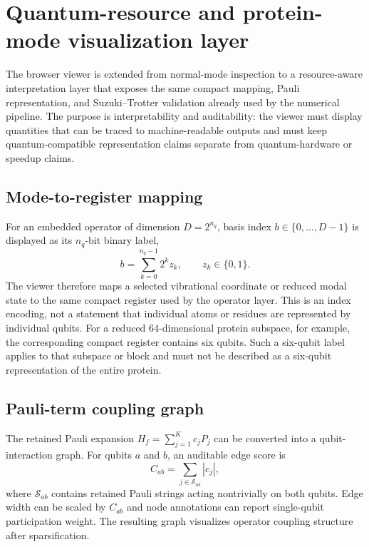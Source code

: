 \documentclass[aps,prx,reprint,10pt]{revtex4-2}
\begin{document}
\pagestyle{empty}
\appendix
\section{Quantum-resource and protein-mode visualization layer}

The browser viewer is extended from normal-mode inspection to a resource-aware interpretation layer that exposes the same compact mapping, Pauli representation, and Suzuki--Trotter validation already used by the numerical pipeline. The purpose is interpretability and auditability: the viewer must display quantities that can be traced to machine-readable outputs and must keep quantum-compatible representation claims separate from quantum-hardware or speedup claims.

\subsection{Mode-to-register mapping}
For an embedded operator of dimension $D=2^{n_q}$, basis index $b\in\{0,\ldots,D-1\}$ is displayed as its $n_q$-bit binary label,
\begin{equation}
 b = \sum_{k=0}^{n_q-1} 2^k z_k,\qquad z_k\in\{0,1\}.
\end{equation}
The viewer therefore maps a selected vibrational coordinate or reduced modal state to the same compact register used by the operator layer. This is an index encoding, not a statement that individual atoms or residues are represented by individual qubits. For a reduced $64$-dimensional protein subspace, for example, the corresponding compact register contains six qubits. Such a six-qubit label applies to that subspace or block and must not be described as a six-qubit representation of the entire protein.

\subsection{Pauli-term coupling graph}
The retained Pauli expansion $H_f=\sum_{j=1}^{K}c_jP_j$ can be converted into a qubit-interaction graph. For qubits $a$ and $b$, an auditable edge score is
\begin{equation}
 C_{ab}=\sum_{j\in\mathcal{S}_{ab}} |c_j|,
\end{equation}
where $\mathcal{S}_{ab}$ contains retained Pauli strings acting nontrivially on both qubits. Edge width can be scaled by $C_{ab}$ and node annotations can report single-qubit participation weight. The resulting graph visualizes operator coupling structure after sparsification.
\end{document}
